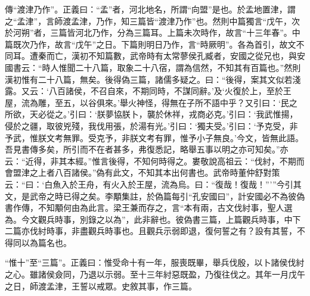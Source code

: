 {\noindent\zhuan{}\fzbyks 傳“渡津乃作”。正義曰：“孟”者，河北地名，所謂“向盟”是也。於孟地置津，謂之“孟津”，言師渡孟津，乃作，知三篇皆“渡津乃作”也。然則中篇獨言“戊午，次於河朔”者，三篇皆河北乃作，分為三篇耳。上篇未次時作，故言“十三年春”。中篇既次乃作，故言“戊午”之日。下篇則明日乃作，言“時厥明”。各為首引，故文不同耳。遭秦而亡，漢初不知篇數，武帝時有太常蓼侯孔臧者，安國之從兄也，與安國書云：“時人惟聞二十八篇，取象二十八宿，謂為信然，不知其有百篇也。”然則漢初惟有二十八篇，無矣。後得偽三篇，諸儒多疑之。曰：“後得，案其文似若淺露。又云：‘八百諸侯，不召自來，不期同時，不謀同辭。’及‘火復於上，至於王屋，流為雕，至五，以谷俱來。’舉火神怪，得無在子所不語中乎？又引曰：‘民之所欲，天必從之。’引曰：‘朕夢協朕卜，襲於休祥，戎商必克。’引曰：‘我武惟揚，侵於之疆，取彼兇殘，我伐用張，於湯有光。’引曰：‘獨夫受。’引曰：‘予克受，非予武，惟朕文考無罪。受克予，非朕文考有罪，惟予小子無良。’今文，皆無此語。吾見書傳多矣，所引而不在者甚多，弗復悉記，略舉五事以明之亦可知矣。”亦云：“近得，非其本經。”惟言後得，不知何時得之。婁敬說高祖云：“伐紂，不期而會盟津之上者八百諸侯。”偽有此文，不知其本出何書也。武帝時董仲舒對策云：“曰：‘白魚入於王舟，有火入於王屋，流為烏。曰：“復哉！復哉！”’”今引其文，是武帝之時已得之矣。李顒集註，於偽篇每引“孔安國曰”，計安國必不為彼偽書作傳，不知顒何由為此言。梁王兼而存之，言“本有兩，古文伐紂事，聖人選為。今文觀兵時事，別錄之以為”，此非辭也。彼偽書三篇，上篇觀兵時事，中下二篇亦伐紂時事，非盡觀兵時事也。且觀兵示弱即退，復何誓之有？設有其誓，不得同以為篇名也。 \par}

{\noindent\shu{}\fzkt “惟十”至“三篇”。正義曰：惟受命十有一年，服喪既畢，舉兵伐殷，以卜諸侯伐紂之心。雖諸侯僉同，乃退以示弱。至十三年紂惡既盈，乃復往伐之。其年一月戊午之日，師渡孟津，王誓以戒眾。史敘其事，作三篇。 \par}

